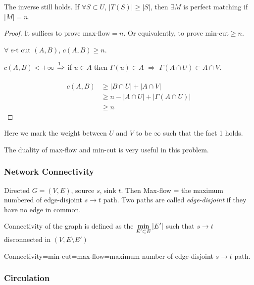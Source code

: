 
\begin{theorem}\label{Hall's Theorem}
    The inverse still holds. \ie  If  $ \forall S\subset U $,  $ |T(S)| \geq |S| $, then  $ \exists M $ is perfect matching if  $ |M|=n $.    
\end{theorem}
\begin{proof}
    It suffices to prove max-flow$ =n $. Or equivalently, to prove min-cut$  \geq n $.
    
    \ie  $ \forall  $ s-t cut  $ (A,B)  $,  $ c(A,B) \geq n $.
    
    $ c(A,B)<+\infty $ $ \xRightarrow{1}  $ if  $ u\in A $ then  $ \Gamma(u)\in A $ $ \Rightarrow  $  $ \Gamma(A\cap U)\subset A\cap V $.
    
    \begin{align*}
        c(A,B) &\geq|B\cap U|+|A\cap V|\\
        & \geq n-|A\cap U|+|\Gamma(A\cap U)|\\
        & \geq n
    \end{align*}
\end{proof}

\begin{remark}
    Here we mark the weight between  $ U  $ and  $ V  $ to be  $ \infty $ such that  the fact 1 holds.

    The duality of max-flow and min-cut is very useful in this problem.
\end{remark}

\subsubsection{Network Connectivity}
\begin{example}
    Directed  $ G=(V,E) $, source  $ s $, sink  $ t $. Then Max-flow = the maximum numbered of edge-disjoint  $ s\to t $ path. Two paths are called \textit{edge-disjoint} if they have no edge in common.
    
    Connectivity of the graph is defined as the  $ \displaystyle\min_{E'\subset E}|E'| $ such that  $ s\to t $ disconnected in  $ (V,E\setminus E') $   
\end{example}
\begin{theorem}
    Connectivity=min-cut=max-flow=maximum number of edge-disjoint  $ s\to t $ path.
\end{theorem}

\subsubsection{Circulation}

